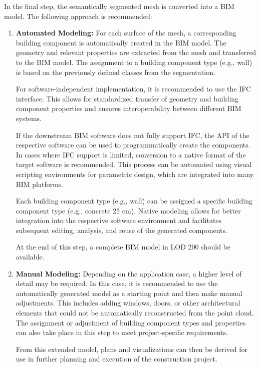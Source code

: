 \begin{English}
    In the final step, the semantically segmented mesh is converted into a BIM model. The following approach is recommended:
    
    \begin{enumerate}
        \item \textbf{Automated Modeling:} For each surface of the mesh, a corresponding building component is automatically created in the BIM model. The geometry and relevant properties are extracted from the mesh and transferred to the BIM model. The assignment to a building component type (e.g., wall) is based on the previously defined classes from the segmentation.

        For software-independent implementation, it is recommended to use the IFC interface. This allows for standardized transfer of geometry and building component properties and ensures interoperability between different BIM systems.

        If the downstream BIM software does not fully support IFC, the API of the respective software can be used to programmatically create the components. In cases where IFC support is limited, conversion to a native format of the target software is recommended. This process can be automated using visual scripting environments for parametric design, which are integrated into many BIM platforms.

        Each building component type (e.g., wall) can be assigned a specific building component type (e.g., concrete 25 cm). Native modeling allows for better integration into the respective software environment and facilitates subsequent editing, analysis, and reuse of the generated components.

        At the end of this step, a complete BIM model in LOD 200 should be available.

        \item \textbf{Manual Modeling:} Depending on the application case, a higher level of detail may be required. In this case, it is recommended to use the automatically generated model as a starting point and then make manual adjustments. This includes adding windows, doors, or other architectural elements that could not be automatically reconstructed from the point cloud. The assignment or adjustment of building component types and properties can also take place in this step to meet project-specific requirements.

        From this extended model, plans and visualizations can then be derived for use in further planning and execution of the construction project.
    \end{enumerate}
\end{English}